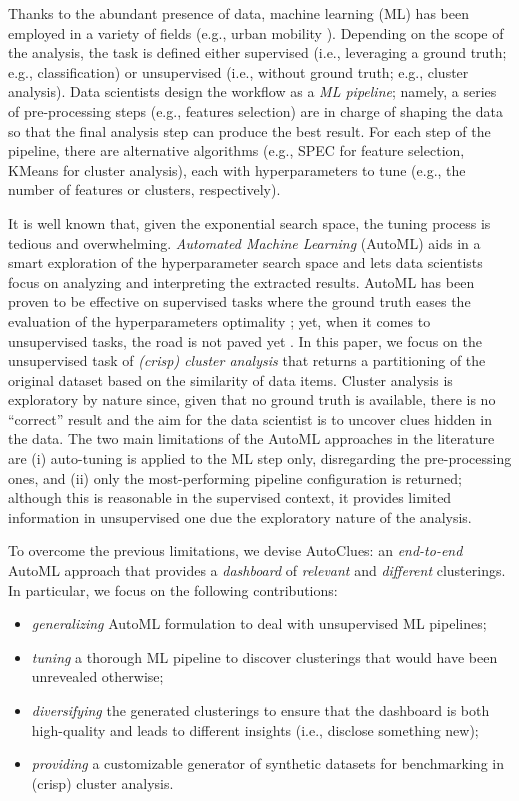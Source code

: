 \documentclass[runningheads]{llncs}
\begin{document}
Thanks to the abundant presence of data, machine learning (ML) has been employed in a variety of fields (e.g., urban mobility \cite{toch2019analyzing}).
Depending on the scope of the analysis, the task is defined either supervised (i.e., leveraging a ground truth; e.g., classification) or unsupervised (i.e., without ground truth; e.g., cluster analysis).
Data scientists design the workflow as a \textit{ML pipeline}; namely, a series of pre-processing steps (e.g., features selection) are in charge of shaping the data so that the final analysis step can produce the best result.
For each step of the pipeline, there are alternative algorithms (e.g., SPEC \cite{zhao2007spectral} for feature selection, KMeans \cite{arthur2006k} for cluster analysis), each with hyperparameters to tune (e.g., the number of features or clusters, respectively).

It is well known that, given the exponential search space, the tuning process is tedious and overwhelming.
\textit{Automated Machine Learning} (AutoML) aids in a smart exploration of the hyperparameter search space \cite{hutter2011sequential} and lets data scientists focus on analyzing and interpreting the extracted results.
AutoML has been proven to be effective on supervised tasks where the ground truth eases the evaluation of the hyperparameters optimality   \cite{thornton2013auto,FRANCIA2023182}; yet, when it comes to unsupervised tasks, the road is not paved yet \cite{barlow1989unsupervised}.
In this paper, we focus on the unsupervised task of \textit{(crisp) cluster analysis} \cite{arthur2006k} that returns a partitioning of the original dataset based on the similarity of data items.
Cluster analysis is exploratory by nature since, given that no ground truth is available, there is no ``correct'' result \cite{lensen2017using} and the aim for the data scientist is to uncover clues hidden
in the data.
The two main limitations of the AutoML approaches in the literature are (i) auto-tuning is applied to the ML step only, disregarding the pre-processing ones, and (ii) only the most-performing pipeline configuration is returned; although this is reasonable in the supervised context, it provides limited information in unsupervised one due the exploratory nature of the analysis. 

To overcome the previous limitations, we devise AutoClues: an \textit{end-to-end} AutoML approach that provides a \textit{dashboard} of \textit{relevant} and \textit{different} clusterings. In particular, we focus on the following contributions:
\begin{itemize}
    \item \textit{generalizing} AutoML formulation to deal with unsupervised ML pipelines;
    \item \textit{tuning} a thorough ML pipeline to discover clusterings that would have been unrevealed otherwise;
    \item \textit{diversifying} the generated clusterings to ensure that the dashboard is both high-quality and leads to different insights (i.e., disclose something new);
    \item \textit{providing} a customizable generator of synthetic datasets for benchmarking in (crisp) cluster analysis.
\end{itemize}
\end{document}
